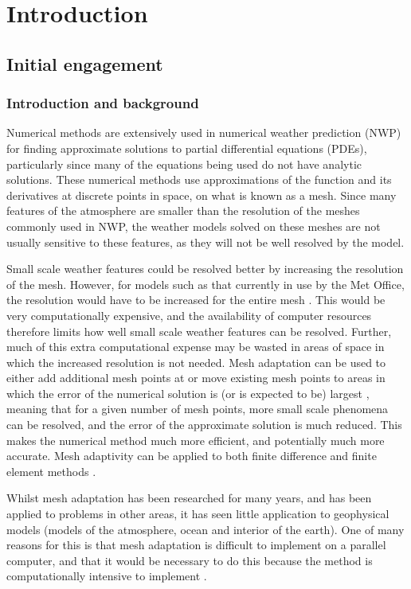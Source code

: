 \chapter{Introduction}
\section{Initial engagement}
\subsection{Introduction and background}
Numerical methods are extensively used in numerical weather prediction (NWP) for finding approximate solutions to partial differential equations (PDEs), particularly since many of the equations being used do not have analytic solutions. These numerical methods use approximations of the function and its derivatives at discrete points in space, on what is known as a mesh. Since many features of the atmosphere are smaller than the resolution of the meshes commonly used in NWP, the weather models solved on these meshes are not usually sensitive to these features, as they will not be well resolved by the model. 

 Small scale weather features could be resolved better by increasing the resolution of the mesh. However, for models such as that currently in use by the Met Office, the resolution would have to be increased for the entire mesh \parencite{endgame}.  This would be very computationally expensive, and the availability of computer resources therefore limits how well small scale weather features can be resolved. Further, much of this extra computational expense may be wasted in areas of space in which the increased resolution is not needed. Mesh adaptation can be used to either add additional mesh points at or move existing mesh points to areas in which the error of the numerical solution is (or is expected to be) largest \parencite{HRR93}, meaning that for a given number of mesh points, more small scale phenomena can be resolved, and the error of the approximate solution is much reduced. This makes the numerical method much more efficient, and potentially much more accurate. Mesh adaptivity can be applied to both finite difference and finite element methods \autocite{HRR93}.

Whilst mesh adaptation has been researched for many years, and has been applied to problems in other areas, it has seen little application to geophysical models (models of the atmosphere, ocean and interior of the earth). One of many reasons for this is that mesh adaptation is difficult to implement on a parallel computer, and that it would be necessary to do this because the method is computationally intensive to implement \parencite{weller10}. 

